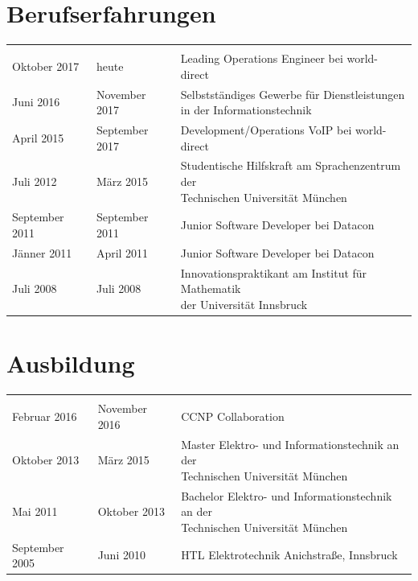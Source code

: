 	\section*{Berufserfahrungen}
	\begin{tabularx}{\textwidth}{b{4cm}|b{3cm}|l}
		\thead{von} & \thead{bis} & \\
		Oktober 2017 & heute & Leading Operations Engineer bei world-direct \\
		Juni 2016 & November 2017 & \makecell[cl]{Selbstständiges Gewerbe für Dienstleistungen \\ in der Informationstechnik} \\
		April 2015 & September 2017 & Development/Operations VoIP bei world-direct \\
		Juli 2012 & März 2015 & \makecell[cl]{Studentische Hilfskraft am Sprachenzentrum der \\ Technischen Universität München} \\
		September 2011 & September 2011 & Junior Software Developer bei Datacon \\
		Jänner 2011 & April 2011 & Junior Software Developer bei Datacon \\
		Juli 2008 & Juli 2008 & \makecell[cl]{Innovationspraktikant am Institut für Mathematik \\ der Universität Innsbruck}
	\end{tabularx}
	
	\section*{Ausbildung}
	\begin{tabularx}{\textwidth}{b{4cm}|b{3cm}|l}
		\thead{von} & \thead{bis} & \\
		Februar 2016 & November 2016 & CCNP Collaboration \\
		Oktober 2013 & März 2015 & \makecell[cl]{Master Elektro- und Informationstechnik an der \\ Technischen Universität München} \\
		Mai 2011 & Oktober 2013 & \makecell[cl]{Bachelor Elektro- und Informationstechnik an der \\ Technischen Universität München} \\
		September 2005 & Juni 2010 & HTL Elektrotechnik Anichstraße, Innsbruck
	\end{tabularx}
	
